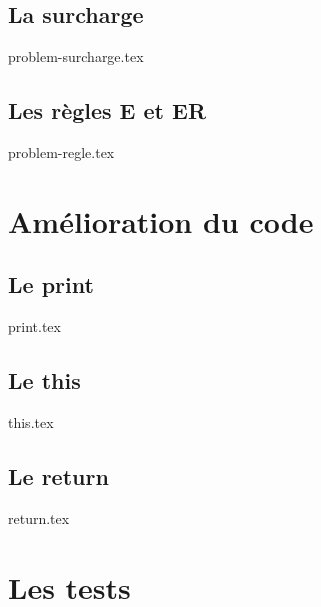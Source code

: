 \documentclass[12pt]{article}
\begin{document}
 	\subsection{La surcharge}
		{problem-surcharge.tex}
	\subsection{Les règles E et ER}
		{problem-regle.tex}
\newpage
\section{Amélioration du code}

	\subsection{Le print}
		{print.tex}

	\subsection{Le this}
		{this.tex}
	\subsection{Le return}
		{return.tex}
\newpage
\section{Les tests}
\end{document}
